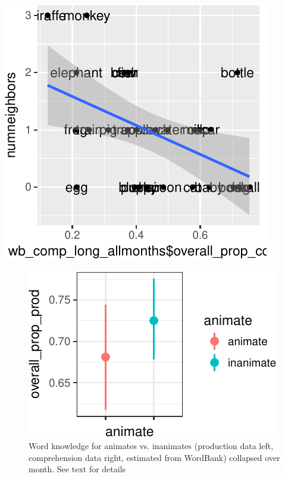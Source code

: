 \documentclass[10pt, letterpaper]{article}
\newenvironment{CodeChunk}{}{}
\begin{document}
\begin{CodeChunk}
\includegraphics{figs/animacy_aoa_overall-2} \end{CodeChunk}

\begin{CodeChunk}
\begin{figure}[tb]
\includegraphics{figs/animacy-aoa-prod-graph-1} \caption[Word knowledge for animates vs]{Word knowledge for animates vs. inanimates (production data left, comprehension data right, estimated from WordBank) collapsed over month. See text for details}\label{fig:animacy-aoa-prod-graph}
\end{figure}
\end{CodeChunk}
\end{document}
